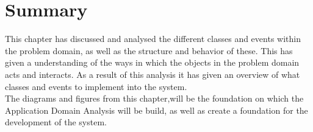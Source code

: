 \section{Summary} \label{ssc:pd_summary}
This chapter has discussed and analysed the different classes and events within the problem domain, as well as the structure and behavior of these.  This has given a understanding of the ways in which the objects in the problem domain acts and interacts. As a result of this analysis it has given an overview of what classes and events to implement into the system. \\
The diagrams and figures from this chapter,will be the foundation on which the Application Domain Analysis will be build, as well as create a foundation for the development of the system.